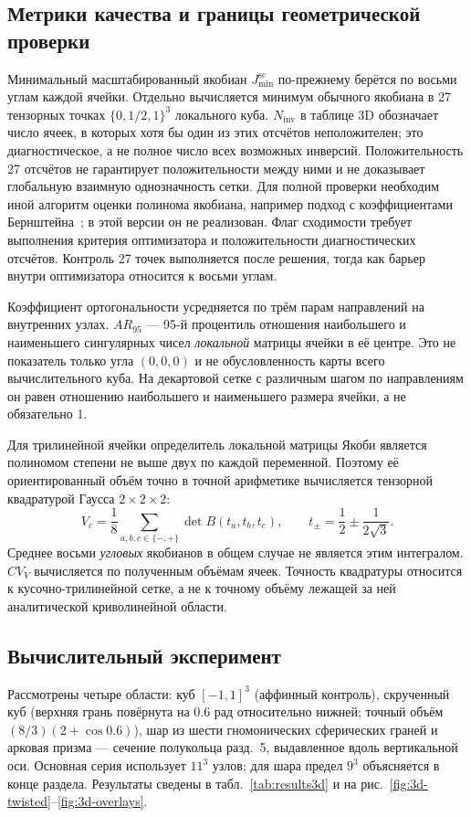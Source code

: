 \documentclass[11pt,a4paper]{article}
\newcommand{\Jsc}{J_{\min}^{\mathrm{sc}}}
\begin{document}
\subsection{Метрики качества и границы геометрической проверки}

Минимальный масштабированный якобиан $\Jsc$ по-прежнему берётся по
восьми углам каждой ячейки. Отдельно вычисляется минимум обычного
якобиана в 27 тензорных точках $\{0,1/2,1\}^3$ локального куба.
$N_{\mathrm{inv}}$ в таблице 3D обозначает число ячеек, в которых
хотя бы один из этих отсчётов неположителен; это диагностическое,
а не полное число всех возможных инверсий. Положительность 27 отсчётов
не гарантирует положительности между ними и не доказывает глобальную
взаимную однозначность сетки. Для полной проверки необходим иной
алгоритм оценки полинома якобиана, например подход с коэффициентами
Бернштейна~\cite{johnen2017}; в этой версии он не реализован.
Флаг сходимости требует выполнения критерия оптимизатора и положительности
диагностических отсчётов. Контроль 27 точек выполняется после решения,
тогда как барьер внутри оптимизатора относится к восьми углам.

Коэффициент ортогональности усредняется по трём парам направлений на
внутренних узлах. $AR_{95}$ --- 95-й процентиль отношения наибольшего
и наименьшего сингулярных чисел \emph{локальной} матрицы ячейки в её центре.
Это не показатель только угла $(0,0,0)$ и не обусловленность карты всего
вычислительного куба. На декартовой сетке с различным шагом по направлениям
он равен отношению наибольшего и наименьшего размера ячейки, а не обязательно 1.

Для трилинейной ячейки определитель локальной матрицы Якоби является
полиномом степени не выше двух по каждой переменной. Поэтому её
ориентированный объём точно в точной арифметике вычисляется тензорной
квадратурой Гаусса $2\times2\times2$:
\[
 V_c=\frac18\sum_{a,b,c\in\{-,+\}}\det B(t_a,t_b,t_c),
 \qquad t_\pm=\frac12\pm\frac{1}{2\sqrt3}.
\]
Среднее восьми \emph{угловых} якобианов в общем случае не является этим
интегралом. $CV_V$ вычисляется по полученным объёмам ячеек.
Точность квадратуры относится к кусочно-трилинейной сетке, а не к
точному объёму лежащей за ней аналитической криволинейной области.

\subsection{Вычислительный эксперимент}

Рассмотрены четыре области: куб \([-1,1]^3\) (аффинный контроль),
скрученный куб (верхняя грань повёрнута на \(0.6\) рад относительно
нижней; точный объём \((8/3)(2+\cos0.6)\)), шар из шести
гномонических сферических граней и арковая призма --- сечение
полукольца разд.~5, выдавленное вдоль вертикальной оси. Основная серия
использует \(11^3\) узлов; для шара предел \(9^3\) объясняется в
конце раздела. Результаты сведены в табл.~\ref{tab:results3d} и на
рис.~\ref{fig:3d-twisted}--\ref{fig:3d-overlays}.
\end{document}
